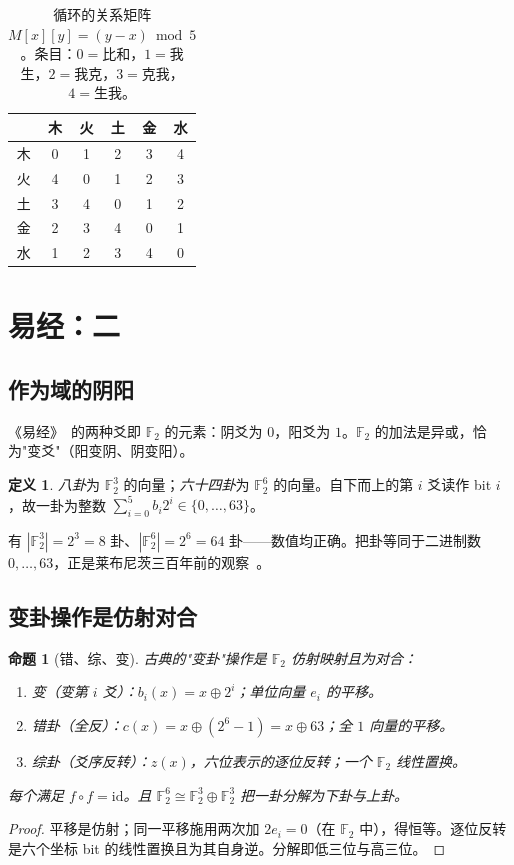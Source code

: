 \documentclass[11pt,a4paper,fontset=none]{ctexart}
\newtheorem{proposition}[theorem]{命题}
\theoremstyle{definition}
\newtheorem{definition}[theorem]{定义}
\theoremstyle{remark}
\newcommand{\F}{\mathbb{F}}
\begin{document}
\begin{table}[h]\centering
\caption{循环的关系矩阵 $M[x][y]=(y-x)\bmod 5$。条目：$0=$比和，$1=$我生，$2=$我克，$3=$克我，$4=$生我。\label{tab:relmatrix}}
\small
\begin{tabular}{c|ccccc}
 & 木 & 火 & 土 & 金 & 水\\ \hline
木 & 0 & 1 & 2 & 3 & 4\\
火 & 4 & 0 & 1 & 2 & 3\\
土 & 3 & 4 & 0 & 1 & 2\\
金 & 2 & 3 & 4 & 0 & 1\\
水 & 1 & 2 & 3 & 4 & 0
\end{tabular}
\end{table}

\section{易经：二}\label{sec:yijing}

\subsection{作为域的阴阳}
《易经》~\cite{zhouyi}的两种爻即 $\F_2$ 的元素：阴爻为 $0$，阳爻为 $1$。$\F_2$ 的加法是异或，恰为"变爻"（阳变阴、阴变阳）。
\begin{definition}
\emph{八卦}为 $\F_2^3$ 的向量；\emph{六十四卦}为 $\F_2^6$ 的向量。自下而上的第 $i$ 爻读作 bit $i$，故一卦为整数 $\sum_{i=0}^{5} b_i 2^i\in\{0,\dots,63\}$。
\end{definition}
有 $|\F_2^3|=2^3=8$ 卦、$|\F_2^6|=2^6=64$ 卦——数值均正确。把卦等同于二进制数 $0,\dots,63$，正是莱布尼茨三百年前的观察~\cite{leibniz1703}。

\subsection{变卦操作是仿射对合}
\begin{proposition}[错、综、变]\label{prop:yijing}
古典的"变卦"操作是 $\F_2$ 仿射映射且为对合：
\begin{enumerate}[leftmargin=*]
  \item \emph{变}（变第 $i$ 爻）：$b_i(x)=x\oplus 2^i$；单位向量 $e_i$ 的平移。
  \item \emph{错卦}（全反）：$c(x)=x\oplus(2^6-1)=x\oplus 63$；全 $1$ 向量的平移。
  \item \emph{综卦}（爻序反转）：$z(x)$，六位表示的逐位反转；一个 $\F_2$ 线性置换。
\end{enumerate}
每个满足 $f\circ f=\mathrm{id}$。且 $\F_2^6\cong\F_2^3\oplus\F_2^3$ 把一卦分解为下卦与上卦。
\end{proposition}
\begin{proof}
平移是仿射；同一平移施用两次加 $2e_i=0$（在 $\F_2$ 中），得恒等。逐位反转是六个坐标 bit 的线性置换且为其自身逆。分解即低三位与高三位。
\end{proof}
\end{document}
